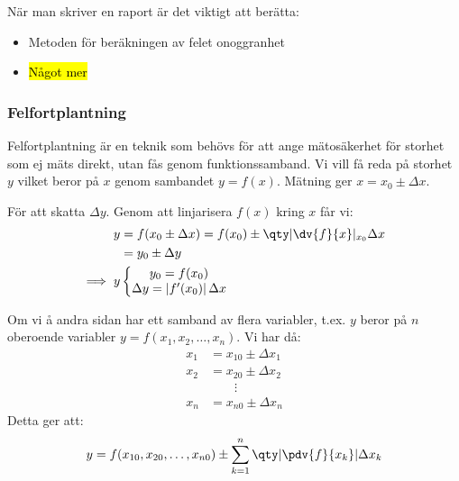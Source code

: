 När man skriver en raport är det viktigt att berätta:
\begin{itemize}
	\item Metoden för beräkningen av felet onoggranhet
	\item \hl{Något mer}
\end{itemize}

\newpage

\subsubsection{Felfortplantning}
Felfortplantning är en teknik som behövs för att ange mätosäkerhet för storhet som
ej mäts direkt, utan fås genom funktionssamband. Vi vill få reda på storhet $y$
vilket beror på $x$ genom sambandet $y=f(x)$. Mätning ger $x=x_0\pm\Delta x$.

För att skatta $\Delta y$. Genom att linjarisera $f(x)$ kring $x$ får vi:
\begin{align*}
	y&=f(x_0\pm\Delta x)=f(x_0)\pm\qty|\dv{f}{x}|_{x_0}\Delta x\\
	&=y_0\pm\Delta y\\
	\implies y&\left\{\begin{matrix}
		y_0=f(x_0)\\
		\Delta y=\left|f'(x_0)\right|\Delta x
	\end{matrix}\right.
\end{align*}

Om vi å andra sidan har ett samband av flera variabler, t.ex. $y$ beror på $n$
oberoende variabler $y=f(x_1,x_2,\dots,x_n)$. Vi har då:
\begin{align*}
	x_1&=x_{10}\pm\Delta x_1\\
	x_2&=x_{20}\pm\Delta x_2\\
	&\qquad\vdots\\
	x_n&=x_{n0}\pm\Delta x_n
\end{align*}
Detta ger att:
$$
	y=f(x_{10},x_{20},\dots,x_{n0})\pm\sum_{k=1}^{n}\qty|\pdv{f}{x_k}|\Delta x_k
$$

